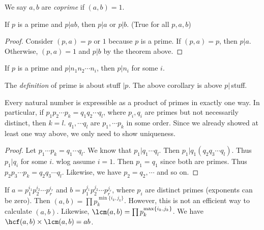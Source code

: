 \documentclass[a4paper]{article}
\begin{document}
  \begin{defi}
    We say $a, b$ are \emph{coprime} if $(a, b) = 1$. 
  \end{defi}

  \begin{cor}
    If $p$ is a prime and $p|ab$, then $p|a$ or $p|b$. (True for all $p, a, b$)
  \end{cor}

  \begin{proof}
    Consider $(p, a) = p$ or $1$ because $p$ is a prime. If $(p, a) = p$, then $p | a$. Otherwise, $(p, a) = 1$ and $p | b$ by the theorem above.
  \end{proof}

  \begin{cor}
    If $p$ is a prime and $p|n_1n_2\cdots n_i$, then $p | n_i$ for some $i$. 
  \end{cor}

  \note The \emph{definition} of prime is about stuff $ | p$. The above corollary is above $p | $\,stuff.

  \begin{thm}
    Every natural number is expressible as a product of primes in exactly one way. In particular, if $p_1p_2\cdots p_k = q_1q_2\cdots q_l$, where $p_i, q_i$ are primes but not necessarily distinct, then $k = l$. $q_1, \cdots q_l$ are $p_1, \cdots p_k$ in some order. Since we already showed at least one way above, we only need to show uniqueness.
  \end{thm}

  \begin{proof}
    Let $p_1\cdots p_k = q_1\cdots q_l$. We know that $p_1 | q_1\cdots q_l$. Then $p_1 | q_1(q_2q_3\cdots q_l)$. Thus $p_1 | q_i$ for some $i$. wlog assume $i = 1$. Then $p_1 = q_1$ since both are primes. Thus $p_2p_3 \cdots p_k = q_2q_3\cdots q_l$. Likewise, we have $p_2 = q_2, \cdots$ and so on.
  \end{proof}

  \begin{cor}
    If $a = p_1^{i_1}p_2^{i_2}\cdots p_r^{i_r}$ and $b = p_1^{j_1}p_2^{j_2}\cdots p_r^{j_r}$, where $p_i$ are distinct primes (exponents can be zero). Then $(a, b)=\prod p_k^{\min\{i_k, j_k\}}$. However, this is not an efficient way to calculate $(a, b)$. Likewise, $\lcm(a, b) = \prod p_k^{\max\{i_k, j_k\}}$. We have $\hcf(a, b)\times\lcm(a, b) = ab$. 
  \end{cor}
\end{document}
